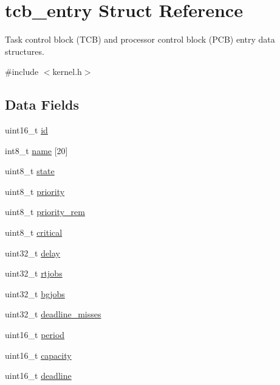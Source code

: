 \hypertarget{structtcb__entry}{}\section{tcb\+\_\+entry Struct Reference}
\label{structtcb__entry}


Task control block (T\+CB) and processor control block (P\+CB) entry data structures.  




{\ttfamily \#include $<$kernel.\+h$>$}

\subsection*{Data Fields}
\begin{DoxyCompactItemize}
\item 
uint16\+\_\+t \hyperlink{structtcb__entry_ac06c8d6513b9d3031956b0efc2ab4871}{id}
\item 
int8\+\_\+t \hyperlink{structtcb__entry_ad7bfcb0f4b58b797af44f3a078abebff}{name} \mbox{[}20\mbox{]}
\item 
uint8\+\_\+t \hyperlink{structtcb__entry_a67f430ab50cb8ff9133e133fc240f3d7}{state}
\item 
uint8\+\_\+t \hyperlink{structtcb__entry_a5a925d67b6f5391815abcbd2c251c77d}{priority}
\item 
uint8\+\_\+t \hyperlink{structtcb__entry_a63888ca7a7a923f912bf3a404d1261ca}{priority\+\_\+rem}
\item 
uint8\+\_\+t \hyperlink{structtcb__entry_ab76fc52c033f2b9cd0adc9474fcde5ef}{critical}
\item 
uint32\+\_\+t \hyperlink{structtcb__entry_ab29fad6168f140493ddc8f860fadc3bc}{delay}
\item 
uint32\+\_\+t \hyperlink{structtcb__entry_a51802bc7ba3ee4cfcbcbfb404e606643}{rtjobs}
\item 
uint32\+\_\+t \hyperlink{structtcb__entry_a27631962295edabd283477b471f2d7ae}{bgjobs}
\item 
uint32\+\_\+t \hyperlink{structtcb__entry_a4594d17577feba0bd0825c8ef5e693db}{deadline\+\_\+misses}
\item 
uint16\+\_\+t \hyperlink{structtcb__entry_a85e14b4c040e0535b45b52a7ee7c9a94}{period}
\item 
uint16\+\_\+t \hyperlink{structtcb__entry_a2a3c8e5e81c910ccd845a8d1f58d550a}{capacity}
\item 
uint16\+\_\+t \hyperlink{structtcb__entry_a14ef4f38d7589e42ac7847b2bcc3443f}{deadline}
\item 

\end{DoxyCompactItemize}
